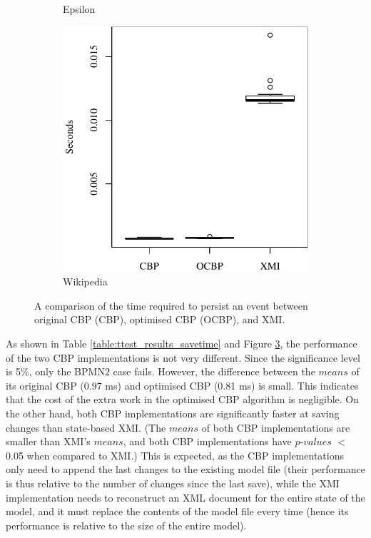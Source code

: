 {\begin{figure}[ht]
\begin{subfigure}{0.325\textwidth}
      \caption{Epsilon}
      \label{fig:save_time_epsilon}
    \end{subfigure}
    \hfill
    \begin{subfigure}{0.325\textwidth}
      \centering
      \includegraphics[width=\linewidth]{images/ol_save_time_wikipedia}
      \caption{Wikipedia}
      \label{fig:save_time_wikipedia}
    \end{subfigure}
    \caption{A comparison of the time required to persist an event between original CBP (CBP), optimised CBP (OCBP), and XMI.}
    \label{fig:savetime}
  \end{figure}
  
  
    As shown in Table \ref{table:ttest_results_savetime} and Figure \ref{fig:savetime}, the performance of the two CBP implementations is not very different. Since the significance level is 5\%, only the BPMN2 case fails. However, the difference between the $means$ of its original CBP (0.97 ms) and optimised CBP (0.81 ms) is small. This indicates that the cost of the extra work in the optimised CBP algorithm is negligible. On the other hand, both CBP implementations are significantly faster at saving changes than state-based XMI. (The $means$ of both CBP implementations are smaller than XMI’s $means$, and both CBP implementations have $p$-$values$ $<$ 0.05 when compared to XMI.) This is expected, as the CBP implementations only need to append the last changes to the existing model file (their performance is thus relative to the number of changes since the last save), while the XMI implementation needs to reconstruct an XML document for the entire state of the model, and it must replace the contents of the model file every time (hence its performance is relative to the size of the entire model).
    

}
